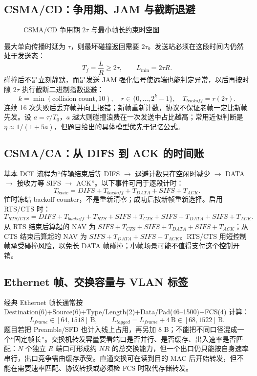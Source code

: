 \documentclass[UTF8,fontset=none,11pt,a4paper]{ctexart}
\begin{document}
\subsection{CSMA/CD：争用期、JAM 与截断退避}

\begin{figure}[htbp]
  \centering
  \resizebox{0.96\linewidth}{!}{}
  \caption{CSMA/CD 争用期 $2\tau$ 与最小帧长约束时空图}
  \label{fig:csmacd-2tau}
\end{figure}


最大单向传播时延为 $\tau$，则最坏碰撞返回需要 $2\tau$。发送站必须在这段时间内仍然处于发送态：
\[
T_f=\frac{L}{R}\ge 2\tau,\qquad L_{\min}=2\tau R.
\]
碰撞后不是立刻静默，而是发送 JAM 强化信号使远端也能判定异常，以后再按时隙 $2\tau$ 执行截断二进制指数退避：
\[
k=\min(\text{collision count},10),\quad r\in\{0,\ldots,2^k-1\},\quad T_{backoff}=r(2\tau).
\]
连续 16 次失败后丢弃帧并向上报错；新帧重新计数，协议不保证老帧一定比新帧先发。设 $a=\tau/T_0$，$a$ 越大则碰撞浪费在一次发送中占比越高；常用近似判断是 $\eta\approx1/(1+5a)$，但题目给出的具体模型优先于记忆公式。

\subsection{CSMA/CA：从 DIFS 到 ACK 的时间账}

基本 DCF 流程为“传输结束后等 DIFS $\to$ 退避计数只在空闲时减少 $\to$ DATA $\to$ 接收方等 SIFS $\to$ ACK”。以下事件可用于逐段计时：
\[
T_{basic}=DIFS+T_{backoff}+T_{DATA}+SIFS+T_{ACK}.
\]
忙时冻结 backoff counter，不是重新清零；成功后按新帧重新选择。启用 RTS/CTS 时：
\[
T_{RTS/CTS}=DIFS+T_{backoff}+T_{RTS}+SIFS+T_{CTS}+SIFS+T_{DATA}+SIFS+T_{ACK}.
\]
从 RTS 结束后算起的 NAV 为 $SIFS+T_{CTS}+SIFS+T_{DATA}+SIFS+T_{ACK}$；从 CTS 结束后算起的 NAV 为 $SIFS+T_{DATA}+SIFS+T_{ACK}$。RTS/CTS 用短控制帧承受碰撞风险，以免长 DATA 帧碰撞；小帧场景可能不值得支付这个控制开销。

\subsection{Ethernet 帧、交换容量与 VLAN 标签}

经典 Ethernet 帧长通常按 Destination(6)+Source(6)+Type/Length(2)+Data/Pad(46--1500)+FCS(4) 计算：
\[
L_{frame}\in[64,1518]\,\mathrm{B},\qquad L_{tagged}=L_{frame}+4\,\mathrm{B}\in[68,1522]\,\mathrm{B}.
\]
题目若把 Preamble/SFD 也计入线上占用，再另加 8 B；不能把不同口径混成一个“固定帧长”。交换机转发容量要看端口是否并行、是否缓存、出入速率是否匹配：$N$ 个独立 $R$ 端口可形成约 $NR$ 的总交换能力，但一个出口仍只能按自身速率串行，出口竞争需由缓存承受。直通交换可在读到目的 MAC 后开始转发，但不能在需要速率匹配、协议转换或必须检 FCS 时取代存储转发。
\end{document}
